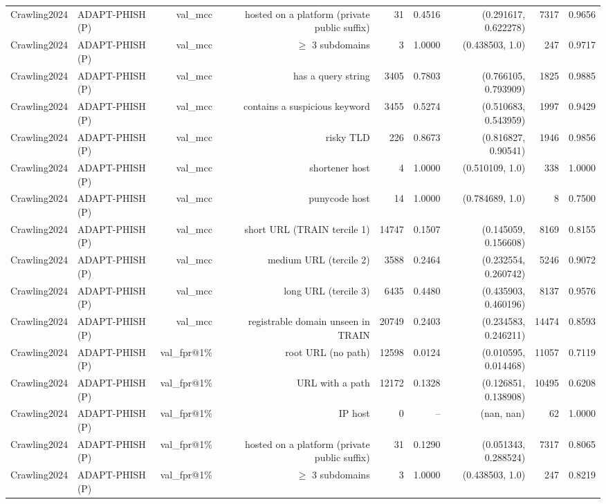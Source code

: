 \begin{table}[t]
\begin{tabular}{llrrrrrrr}
Crawling2024 & ADAPT-PHISH (P) & val\_mcc & hosted on a platform (private public suffix) & 31 & 0.4516 & (0.291617, 0.622278) & 7317 & 0.9656 \\
Crawling2024 & ADAPT-PHISH (P) & val\_mcc & $\geq$ 3 subdomains & 3 & 1.0000 & (0.438503, 1.0) & 247 & 0.9717 \\
Crawling2024 & ADAPT-PHISH (P) & val\_mcc & has a query string & 3405 & 0.7803 & (0.766105, 0.793909) & 1825 & 0.9885 \\
Crawling2024 & ADAPT-PHISH (P) & val\_mcc & contains a suspicious keyword & 3455 & 0.5274 & (0.510683, 0.543959) & 1997 & 0.9429 \\
Crawling2024 & ADAPT-PHISH (P) & val\_mcc & risky TLD & 226 & 0.8673 & (0.816827, 0.90541) & 1946 & 0.9856 \\
Crawling2024 & ADAPT-PHISH (P) & val\_mcc & shortener host & 4 & 1.0000 & (0.510109, 1.0) & 338 & 1.0000 \\
Crawling2024 & ADAPT-PHISH (P) & val\_mcc & punycode host & 14 & 1.0000 & (0.784689, 1.0) & 8 & 0.7500 \\
Crawling2024 & ADAPT-PHISH (P) & val\_mcc & short URL (TRAIN tercile 1) & 14747 & 0.1507 & (0.145059, 0.156608) & 8169 & 0.8155 \\
Crawling2024 & ADAPT-PHISH (P) & val\_mcc & medium URL (tercile 2) & 3588 & 0.2464 & (0.232554, 0.260742) & 5246 & 0.9072 \\
Crawling2024 & ADAPT-PHISH (P) & val\_mcc & long URL (tercile 3) & 6435 & 0.4480 & (0.435903, 0.460196) & 8137 & 0.9576 \\
Crawling2024 & ADAPT-PHISH (P) & val\_mcc & registrable domain unseen in TRAIN & 20749 & 0.2403 & (0.234583, 0.246211) & 14474 & 0.8593 \\
Crawling2024 & ADAPT-PHISH (P) & val\_fpr@1\% & root URL (no path) & 12598 & 0.0124 & (0.010595, 0.014468) & 11057 & 0.7119 \\
Crawling2024 & ADAPT-PHISH (P) & val\_fpr@1\% & URL with a path & 12172 & 0.1328 & (0.126851, 0.138908) & 10495 & 0.6208 \\
Crawling2024 & ADAPT-PHISH (P) & val\_fpr@1\% & IP host & 0 & -- & (nan, nan) & 62 & 1.0000 \\
Crawling2024 & ADAPT-PHISH (P) & val\_fpr@1\% & hosted on a platform (private public suffix) & 31 & 0.1290 & (0.051343, 0.288524) & 7317 & 0.8065 \\
Crawling2024 & ADAPT-PHISH (P) & val\_fpr@1\% & $\geq$ 3 subdomains & 3 & 1.0000 & (0.438503, 1.0) & 247 & 0.8219 \\

\end{tabular}
\end{table}

